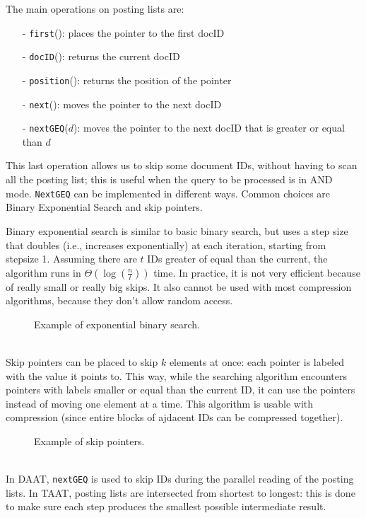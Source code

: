 The main operations on posting lists are:
\begin{itemize}[itemsep=0pt]
    \item[-] \texttt{first}(): places the pointer to the first docID
    \item[-] \texttt{docID}(): returns the current docID
    \item[-] \texttt{position}(): returns the position of the pointer
    \item[-] \texttt{next}(): moves the pointer to the next docID
    \item[-] \texttt{nextGEQ}($d$): moves the pointer to the next docID that is greater or equal than $d$
\end{itemize}
This last operation allows us to skip some document IDs, without having to scan all the posting list; this is useful when the query to be processed is in AND mode. \texttt{NextGEQ} can be implemented in different ways. Common choices are Binary Exponential Search and skip pointers.

Binary exponential search is similar to basic binary search, but uses a step size that doubles (i.e., increases exponentially) at each iteration, starting from stepsize 1. Assuming there are $t$ IDs greater of equal than the current, the algorithm runs in $\Theta (\log(\frac{n}{t}))$ time. In practice, it is not very efficient because of really small or really big skips. It also cannot be used with most compression algorithms, because they don't allow random access.
\begin{figure}[!ht]
    \centering
    
    \caption{Example of exponential binary search.}
    \label{fig:binary-search}
\end{figure} \\
Skip pointers can be placed to skip $k$ elements at once: each pointer is labeled with the value it points to. This way, while the searching algorithm encounters pointers with labels smaller or equal than the current ID, it can use the pointers instead of moving one element at a time. This algorithm is usable with compression (since entire blocks of ajdacent IDs can be compressed together).
\begin{figure}[!ht]
    \centering
    
    \caption{Example of skip pointers.}
    \label{fig:skip-pointers}
\end{figure} \\
In DAAT, \texttt{nextGEQ} is used to skip IDs during the parallel reading of the posting lists. In TAAT, posting lists are intersected from shortest to longest: this is done to make sure each step produces the smallest possible intermediate result.

